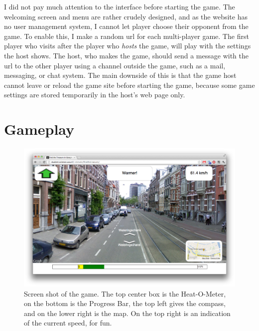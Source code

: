 \documentclass[a4paper,10pt]{article}
\begin{document}
I did not pay much attention to the interface before starting the game. The welcoming screen and menu are rather crudely designed, and as the website has no user management system, I cannot let player choose their opponent from the game. To enable this, I make a random url for each multi-player game. The first player who visits after the player who \emph{hosts} the game, will play with the settings the host shows. The host, who makes the game, should send a message with the url to the other player using a channel outside the game, such as a mail, messaging, or chat system. The main downside of this is that the game host cannot leave or reload the game site before starting the game, because some game settings are stored temporarily in the host's web page only.

\section{Gameplay} %
\label{sec:gameplay}
\begin{figure}[hbt]
    \centering
    \includegraphics[width=\textwidth]{screenshot}
    \caption{Screen shot of the game. The top center box is the Heat-O-Meter, on the bottom is the Progress Bar, the top left gives the compass, and on the lower right is the map. On the top right is an indication of the current speed, for fun.}
\end{figure}
\end{document}
